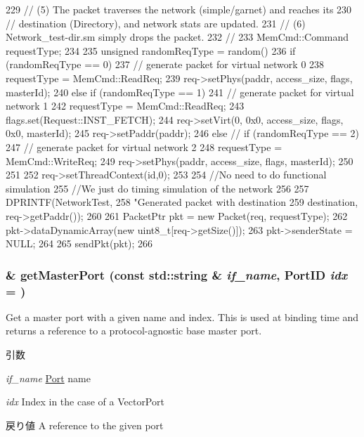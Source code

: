 \begin{DoxyCode}
{229     // (5) The packet traverses the network (simple/garnet) and reaches its
230     //     destination (Directory), and network stats are updated.
231     // (6) Network_test-dir.sm simply drops the packet.
232     // 
233     MemCmd::Command requestType;
234 
235     unsigned randomReqType = random() %
236     if (randomReqType == 0) {
237         // generate packet for virtual network 0
238         requestType = MemCmd::ReadReq;
239         req->setPhys(paddr, access_size, flags, masterId);
240     } else if (randomReqType == 1) {
241         // generate packet for virtual network 1
242         requestType = MemCmd::ReadReq;
243         flags.set(Request::INST_FETCH);
244         req->setVirt(0, 0x0, access_size, flags, 0x0, masterId);
245         req->setPaddr(paddr);
246     } else {  // if (randomReqType == 2)
247         // generate packet for virtual network 2
248         requestType = MemCmd::WriteReq;
249         req->setPhys(paddr, access_size, flags, masterId);
250     }
251 
252     req->setThreadContext(id,0);
253 
254     //No need to do functional simulation
255     //We just do timing simulation of the network
256 
257     DPRINTF(NetworkTest,
258             "Generated packet with destination %
259             destination, req->getPaddr());
260 
261     PacketPtr pkt = new Packet(req, requestType);
262     pkt->dataDynamicArray(new uint8_t[req->getSize()]);
263     pkt->senderState = NULL;
264 
265     sendPkt(pkt);
266 }
\end{DoxyCode}
\hypertarget{classNetworkTest_adc4e675e51defbdd1e354dac729d0703}{
\subsubsection[{getMasterPort}]{ \& getMasterPort (const std::string \& {\em if\_\-name}, \/  {\bf PortID} {\em idx} = {})}}
\label{classNetworkTest_adc4e675e51defbdd1e354dac729d0703}
Get a master port with a given name and index. This is used at binding time and returns a reference to a protocol-\/agnostic base master port.


\begin{DoxyParams}{引数}
\item[{\em if\_\-name}]\hyperlink{classPort}{Port} name \item[{\em idx}]Index in the case of a VectorPort\end{DoxyParams}
\begin{DoxyReturn}{戻り値}
A reference to the given port 
\end{DoxyReturn}


